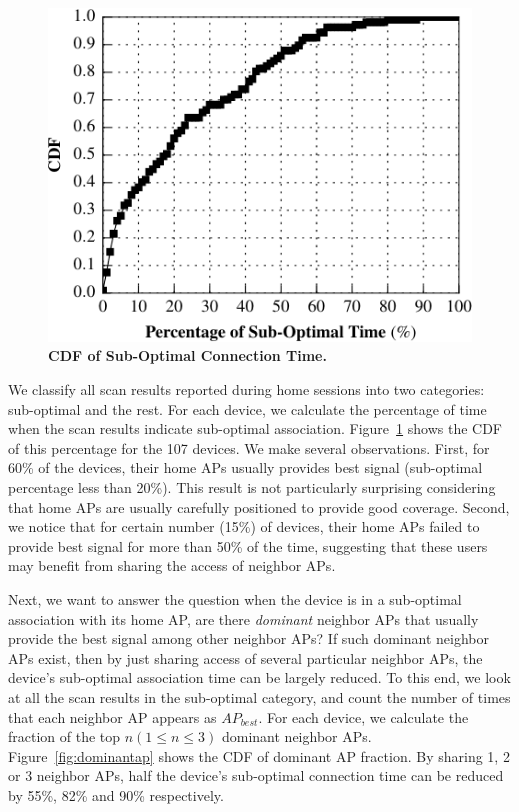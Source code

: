 \begin{figure}[t]
  \centering
  \includegraphics[width=\columnwidth]{./figures/HomeAPSessionRSSI.pdf}
  \caption{\textbf{CDF of Sub-Optimal Connection Time.}}
  \label{fig:suboptimal}
  \vspace*{-4mm}
\end{figure}

We classify all scan results reported during home \wifi{} sessions into
two categories: sub-optimal and the rest. For each device, we calculate the
percentage of time when the scan results indicate sub-optimal association.
Figure~\ref{fig:suboptimal} shows the CDF of this percentage for 
the 107 devices. We make several observations. First, for 60\% of the devices,
their home APs usually provides best signal (sub-optimal percentage less than
20\%). This result is not particularly surprising considering that home APs are
usually carefully positioned to provide good coverage. Second, we notice
that for certain number (15\%) of devices, their home APs failed to provide best
signal for more than 50\% of the time, suggesting that these users may benefit
from sharing the \wifi{} access of neighbor APs.

Next, we want to answer the question when the device is in a sub-optimal association
with its home AP, are there \textit{dominant} neighbor APs that
usually provide the best signal among other neighbor APs? If such dominant
neighbor APs exist, then by just sharing access of several particular neighbor
APs, the device's sub-optimal association time can be largely reduced. To this
end, we look at all the scan results in the sub-optimal category, and count the
number of times that each neighbor AP appears as $AP_{best}$. For each device,
we calculate the fraction of the top $n (1 \le n \le 3)$ dominant neighbor APs.
Figure~\ref{fig:dominantap} shows the CDF of dominant AP fraction. By sharing 1,
2 or 3 neighbor APs, half the device's sub-optimal connection time can be
reduced by 55\%, 82\% and 90\% respectively.

